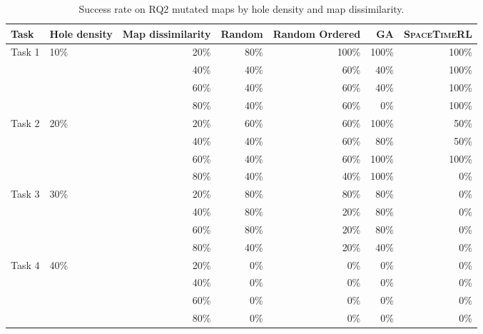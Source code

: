 \begin{table}[htbp]
    \centering
    \small
    \caption{Success rate on RQ2 mutated maps by hole density and map dissimilarity.}
    \label{tab:rq2-success-rate-summary}
    \begin{tabular}{llrrrrr}
        \toprule
        Task & Hole density & Map dissimilarity & Random & Random Ordered & GA & \textsc{SpaceTimeRL} \\
        \midrule
        \multirow{4}{*}{Task 1} & \multirow{4}{*}{10\%} & 20\% & 80\% & 100\% & 100\% & 100\% \\
         &  & 40\% & 40\% & 60\% & 40\% & 100\% \\
         &  & 60\% & 40\% & 60\% & 40\% & 100\% \\
         &  & 80\% & 40\% & 60\% & 0\% & 100\% \\
        \midrule
        \multirow{4}{*}{Task 2} & \multirow{4}{*}{20\%} & 20\% & 60\% & 60\% & 100\% & 50\% \\
         &  & 40\% & 40\% & 60\% & 80\% & 50\% \\
         &  & 60\% & 40\% & 60\% & 100\% & 100\% \\
         &  & 80\% & 40\% & 40\% & 100\% & 0\% \\
        \midrule
        \multirow{4}{*}{Task 3} & \multirow{4}{*}{30\%} & 20\% & 80\% & 80\% & 80\% & 0\% \\
         &  & 40\% & 80\% & 20\% & 80\% & 0\% \\
         &  & 60\% & 80\% & 20\% & 80\% & 0\% \\
         &  & 80\% & 40\% & 20\% & 40\% & 0\% \\
        \midrule
        \multirow{4}{*}{Task 4} & \multirow{4}{*}{40\%} & 20\% & 0\% & 0\% & 0\% & 0\% \\
         &  & 40\% & 0\% & 0\% & 0\% & 0\% \\
         &  & 60\% & 0\% & 0\% & 0\% & 0\% \\
         &  & 80\% & 0\% & 0\% & 0\% & 0\% \\
        \bottomrule
    \end{tabular}
\end{table}
